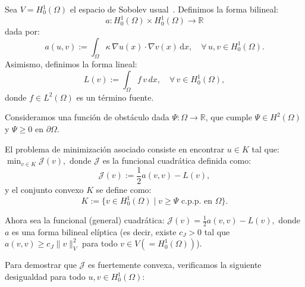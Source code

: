 \documentclass[12pt]{book}
\theoremstyle{definition}
\theoremstyle{plain}
\theoremstyle{remark}
\begin{document}
Sea $V=H^1_0(\Omega)$ el espacio de Sobolev usual~\cite{allaire2007}.
Definimos la forma bilineal:
\[
a : H^1_0 (\Omega) \times H^1_0 (\Omega) \to \mathbb{R}
\]
dada por:
\[
a(u,v) := \int_{\Omega} \kappa \, \nabla u(x) \cdot \nabla v(x) \, \mathrm{d}x, \quad \forall \, u,v \in H^1_0 (\Omega).
\]
%
Asimismo, definimos la forma lineal:
\[
L(v) := \int_{\Omega} f \, v \, dx, \quad \forall \, v \in H^1_0 (\Omega),
\]
donde \(f \in L^2(\Omega)\) es un término fuente.


Consideramos una función de obstáculo dada \(\Psi : \Omega \to \mathbb{R}\), que cumple \(\Psi \in H^2(\Omega)\) y \(\Psi \geq 0\) en \(\partial \Omega\). %

El problema de minimización asociado consiste en encontrar \(u \in K\) tal que:
$
\min_{v \in K} \mathcal{J}(v),
$
donde \(\mathcal{J}\) es la funcional cuadrática definida como:
\[
\mathcal{J}(v) := \frac{1}{2} a(v,v) - L(v),
\]
y el conjunto convexo \(K\) se define como:
\[
K := \{ v \in H^1_0(\Omega) \mid v \geq \Psi \text{ c.p.p. en } \Omega \}.
\]

Ahora sea la funcional (general) cuadrática:
$
\mathcal{J}(v) = \frac{1}{2} a(v,v) - L(v),
$
donde \(a\) es una forma bilineal elíptica (es decir, existe \(c_J > 0\) tal que \(a(v,v) \geq c_J \|v\|_V^2\) para todo \(v \in V(=H^1_0(\Omega))\)).
%

Para demostrar que \(\mathcal{J}\) es fuertemente convexa, verificamos la siguiente desigualdad para todo \(u, v \in H^1_0(\Omega)\):
\end{document}
